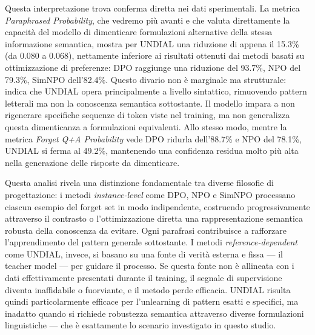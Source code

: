 Questa interpretazione trova conferma diretta nei dati sperimentali. La metrica \emph{Paraphrased Probability}, che vedremo più avanti e che valuta direttamente la capacità del modello di dimenticare formulazioni alternative della stessa informazione semantica, mostra per UNDIAL una riduzione di appena il 15.3\% (da 0.080 a 0.068), nettamente inferiore ai risultati ottenuti dai metodi basati su ottimizzazione di preferenze: DPO raggiunge una riduzione del 93.7\%, NPO del 79.3\%, SimNPO dell'82.4\%. Questo divario non è marginale ma strutturale: indica che UNDIAL opera principalmente a livello sintattico, rimuovendo pattern letterali ma non la conoscenza semantica sottostante. Il modello impara a non rigenerare specifiche sequenze di token viste nel training, ma non generalizza questa dimenticanza a formulazioni equivalenti. Allo stesso modo, mentre la metrica \emph{Forget Q+A Probability} vede DPO ridurla dell'88.7\% e NPO del 78.1\%, UNDIAL si ferma al 49.2\%, mantenendo una confidenza residua molto più alta nella generazione delle risposte da dimenticare.

Questa analisi rivela una distinzione fondamentale tra diverse filosofie di progettazione: i metodi \emph{instance-level} come DPO, NPO e SimNPO processano ciascun esempio del forget set in modo indipendente, costruendo progressivamente attraverso il contrasto o l'ottimizzazione diretta una rappresentazione semantica robusta della conoscenza da evitare. Ogni parafrasi contribuisce a rafforzare l'apprendimento del pattern generale sottostante. I metodi \emph{reference-dependent} come UNDIAL, invece, si basano su una fonte di verità esterna e fissa — il teacher model — per guidare il processo. Se questa fonte non è allineata con i dati effettivamente presentati durante il training, il segnale di supervisione diventa inaffidabile o fuorviante, e il metodo perde efficacia. UNDIAL risulta quindi particolarmente efficace per l'unlearning di pattern esatti e specifici, ma inadatto quando si richiede robustezza semantica attraverso diverse formulazioni linguistiche — che è esattamente lo scenario investigato in questo studio.

